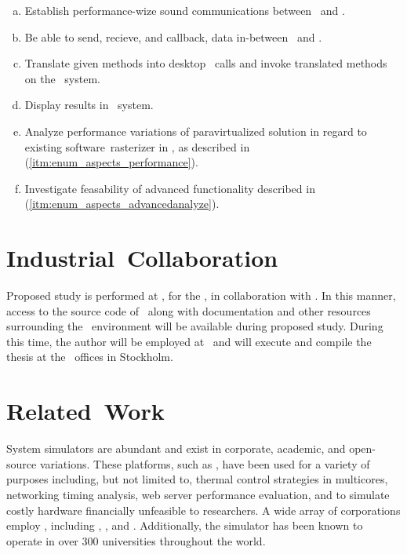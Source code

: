 \newcommand*\objective[1]{\item}%
\begin{multicols}{2}
\begin{enumerate}[(a)]
	\objective{1} Establish performance-wize sound communications between \termhost\ and \termtarget .
	\objective{2} Be able to send, recieve, and callback, data in-between \termhost\ and \termtarget .
	\objective{3} Translate given methods into desktop \termapi\ calls and invoke translated methods on the \termhost\ system.
	\objective{4} Display results in \termtarget\ system.
	\objective{5} Analyze performance variations of paravirtualized solution in regard to existing software~rasterizer in \termsimics , as described in (\ref{itm:enum_aspects_performance}).
	\objective{6} Investigate feasability of advanced functionality described in (\ref{itm:enum_aspects_advancedanalyze}).
\end{enumerate}
\end{multicols}

\section{Industrial~Collaboration}
\label{sec:aimandobjectives_industrialcollaboration}
Proposed study is performed at \termbth , for the \termbthdept , in collaboration with \termintel .
In this manner, access to the source code of \termsimics\ along with documentation and other resources surrounding the \termsimics\ environment will be available during proposed study.
During this time, the author will be employed at \termintel\ and will execute and compile the thesis at the \termintel\ offices in Stockholm.

\section{Related~Work}
\label{sec:aimandobjectives_relatedwork}
System simulators are abundant and exist in corporate, academic, and open-source variations.
These platforms, such as \termsimics , have been used for a variety of purposes including, but not limited to, thermal control strategies in multicores, networking timing analysis, web server performance evaluation, and to simulate costly hardware financially unfeasible to researchers.
A wide array of corporations employ \termsimics , including \termibm {}, \termintel {}, and \termnasa {}.
Additionally, the simulator has been known to operate in over $300$ universities throughout the world.\\

